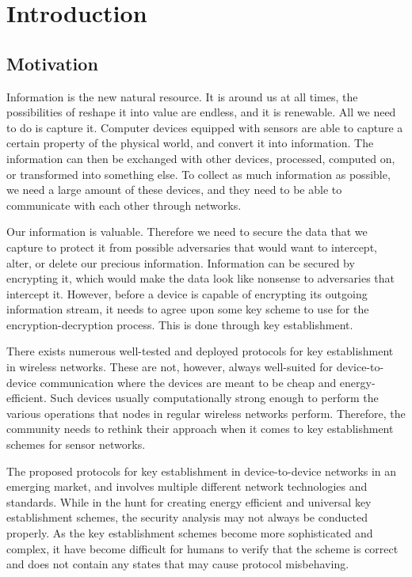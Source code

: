 \chapter{Introduction}
\label{chp:introduction} 


\section{Motivation}


Information is the new natural resource. It is around us at all times, the possibilities of reshape it into value are endless, and it is renewable. All we need to do is capture it. Computer devices equipped with sensors are able to capture a certain property of the physical world, and convert it into information. The information can then be exchanged with other devices, processed, computed on, or transformed into something else. To collect as much information as possible, we need a large amount of these devices, and they need to be able to communicate with each other through networks. 

Our information is valuable. Therefore we need to secure the data that we capture to protect it from possible adversaries that would want to intercept, alter, or delete our precious information. Information can be secured by encrypting it, which would make the data look like nonsense to adversaries that intercept it. However, before a device is capable of encrypting its outgoing information stream, it needs to agree upon some key scheme to use for the encryption-decryption process. This is done through key establishment. 

There exists numerous well-tested and deployed protocols for key establishment in wireless networks. These are not, however, always well-suited for device-to-device communication where the devices are meant to be cheap and energy-efficient. Such devices usually computationally strong enough to perform the various operations that nodes in regular wireless networks perform. Therefore, the community needs to rethink their approach when it comes to key establishment schemes for sensor networks.

The proposed protocols for key establishment in device-to-device networks in an emerging market, and involves multiple different network technologies and standards. While in the hunt for creating energy efficient and universal key establishment schemes, the security analysis may not always be conducted properly. As the key establishment schemes become more sophisticated and complex, it have become difficult for humans to verify that the scheme is correct and does not contain any states that may cause protocol misbehaving.


